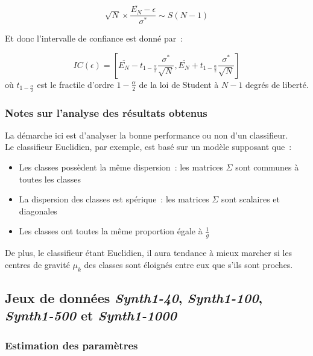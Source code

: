 \documentclass[a4paper,10pt]{report}
\begin{document}
\[
\sqrt{N} \times  \frac{\overline{E_{N}} - \epsilon}{\sigma^*} \sim S(N-1)
\]

Et donc l'intervalle de confiance est donné par~:

\[
IC(\epsilon) = [ \overline{E_{N}} - t_{1-\frac{\alpha}{2}} \frac{\sigma^*}{\sqrt{N}} , \overline{E_{N}} + t_{1-\frac{\alpha}{2}} \frac{\sigma^*}{\sqrt{N}}]
\]
où $t_{1-\frac{\alpha}{2}}$ est le fractile d'ordre $1-\frac{\alpha}{2}$ de la loi de Student à $N-1$ degrés de liberté.



\subsubsection{Notes sur l'analyse des résultats obtenus}

La démarche ici est d'analyser la bonne performance ou non d'un classifieur.\\

Le classifieur Euclidien, par exemple, est basé sur un modèle supposant que~:
\begin{itemize}
	\item Les classes possèdent la même dispersion~: les matrices $\Sigma$ sont communes à toutes les classes
	\item La dispersion des classes est spérique~: les matrices $\Sigma$ sont scalaires et diagonales
	\item Les classes ont toutes la même proportion égale à $\frac{1}{g}$
\end{itemize}

De plus, le classifieur étant Euclidien, il aura tendance à mieux marcher si les centres de gravité $\mu_{k}$ des classes sont éloignés entre eux que s'ils sont proches.\\


\subsection{Jeux de données \textit{Synth1-40}, \textit{Synth1-100}, \textit{Synth1-500} et \textit{Synth1-1000}}



\subsubsection{Estimation des paramètres}
\end{document}
